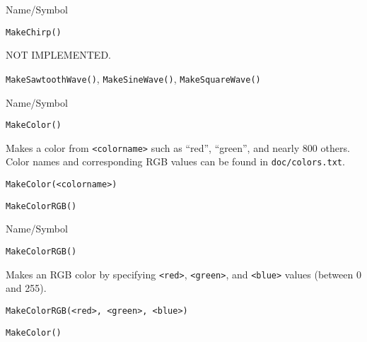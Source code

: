 \begin{desc}{Name/Symbol}
\item[Name/Symbol]	\verb+MakeChirp()+  

\item[Description]	NOT IMPLEMENTED.

\item[Usage]		

\item[Example]	

\item[See Also]	\verb+MakeSawtoothWave()+, \verb+MakeSineWave()+, \verb+MakeSquareWave()+
\end{desc}

\rl




\begin{desc}{Name/Symbol}
\item[Name/Symbol]	\verb+MakeColor()+

\item[Description] Makes a color from \verb+<colorname>+ such as
  ``red'', ``green'', and nearly 800 others.  Color names and
  corresponding RGB values can be found in \verb+doc/colors.txt+.

\item[Usage]
\begin{verbatim}
MakeColor(<colorname>)
\end{verbatim}

\item[Example]	

\item[See Also]	\verb+MakeColorRGB()+
\end{desc}

\rl


\begin{desc}{Name/Symbol}
\item[Name/Symbol]	\verb+MakeColorRGB()+ 

\item[Description] Makes an RGB color by specifying \verb+<red>+,
  \verb+<green>+, and \verb+<blue>+ values (between 0 and 255).

\item[Usage]		
\begin{verbatim}
MakeColorRGB(<red>, <green>, <blue>)
\end{verbatim}

\item[Example]	

\item[See Also]	\verb+MakeColor()+
\end{desc}

